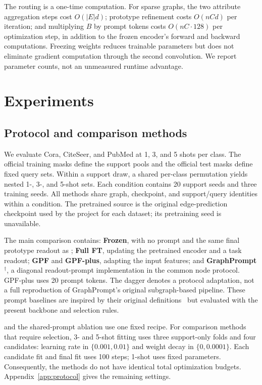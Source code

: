 The routing is a one-time computation. For sparse graphs, the two attribute aggregation steps cost $O(|E|d)$; prototype refinement costs $O(nCd)$ per iteration; and multiplying $B$ by prompt tokens costs $O(nC\cdot128)$ per optimization step, in addition to the frozen encoder's forward and backward computations. Freezing weights reduces trainable parameters but does not eliminate gradient computation through the second convolution. We report parameter counts, not an unmeasured runtime advantage.

\section{Experiments}
\subsection{Protocol and comparison methods}
\label{sec:protocol}
We evaluate Cora, CiteSeer, and PubMed at 1, 3, and 5 shots per class. The official training masks define the support pools and the official test masks define fixed query sets. Within a support draw, a shared per-class permutation yields nested 1-, 3-, and 5-shot sets. Each condition contains 20 support seeds and three training seeds. All methods share graph, checkpoint, and support/query identities within a condition. The pretrained source is the original edge-prediction checkpoint used by the project for each dataset; its pretraining seed is unavailable.

The main comparison contains: \textbf{Frozen}, with no prompt and the same final prototype readout as \method; \textbf{Full FT}, updating the pretrained encoder and a task readout; \textbf{GPF} and \textbf{GPF-plus}, adapting the input features; and \textbf{GraphPrompt$^{\dagger}$}, a diagonal readout-prompt implementation in the common node protocol. GPF-plus uses 20 prompt tokens. The dagger denotes a protocol adaptation, not a full reproduction of GraphPrompt's original subgraph-based pipeline. These prompt baselines are inspired by their original definitions~\citep{gpf2023,graphprompt2023} but evaluated with the present backbone and selection rules.

\method{} and the shared-prompt ablation use one fixed recipe. For comparison methods that require selection, 3- and 5-shot fitting uses three support-only folds and four candidates: learning rate in $\{0.001,0.01\}$ and weight decay in $\{0,0.0001\}$. Each candidate fit and final fit uses 100 steps; 1-shot uses fixed parameters. Consequently, the methods do not have identical total optimization budgets. Appendix~\ref{app:protocol} gives the remaining settings.

